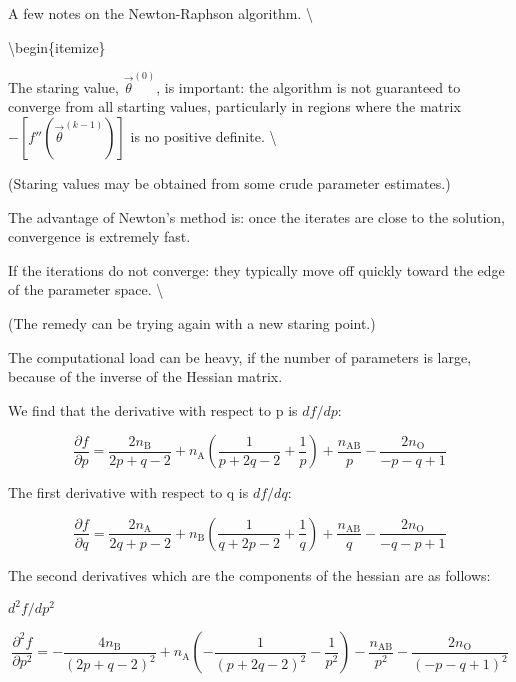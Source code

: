 \documentclass[]{article}
\begin{document}
\pagebreak

\item 

A few notes on the Newton-Raphson algorithm. \textbackslash{}

\textbackslash{}begin\{itemize\}

\item 

The staring value, \(\vec \theta ^{(0)}\), is important: the algorithm
is not guaranteed to converge from all starting values, particularly in
regions where the matrix \(- [f''(\vec \theta^{(k-1)})]\) is no positive
definite. \textbackslash{}

(Staring values may be obtained from some crude parameter estimates.)
\smallskip

\item 

The advantage of Newton's method is: once the iterates are close to the
solution, convergence is extremely fast. \smallskip

\item 

If the iterations do not converge: they typically move off quickly
toward the edge of the parameter space. \textbackslash{}

(The remedy can be trying again with a new staring point.) \smallskip

\item 

The computational load can be heavy, if the number of parameters is
large, because of the inverse of the Hessian matrix.

We find that the derivative with respect to p is \(df/dp\):

\[ \frac{\partial f}{\partial p } = \dfrac{2n_\text{B}}{2p+q-2}+n_\text{A}\left(\dfrac{1}{p+2q-2}+\dfrac{1}{p}\right)+\dfrac{n_\text{AB}}{p}-\dfrac{2n_\text{O}}{-p-q+1}
\]

The first derivative with respect to q is \(df/dq\):

\[\frac{\partial f}{\partial q } = \dfrac{2n_\text{A}}{2q+p-2}+n_\text{B}\left(\dfrac{1}{q+2p-2}+\dfrac{1}{q}\right)+\dfrac{n_\text{AB}}{q}-\dfrac{2n_\text{O}}{-q-p+1}
\]

The second derivatives which are the components of the hessian are as
follows:

\(d^2f/dp^2\)

\[ \frac{\partial^2 f}{\partial p^2} = -\dfrac{4n_\text{B}}{\left(2p+q-2\right)^2}+n_\text{A}\left(-\dfrac{1}{\left(p+2q-2\right)^2}-\dfrac{1}{p^2}\right)-\dfrac{n_\text{AB}}{p^2}-\dfrac{2n_\text{O}}{\left(-p-q+1\right)^2}
\]
\end{document}
